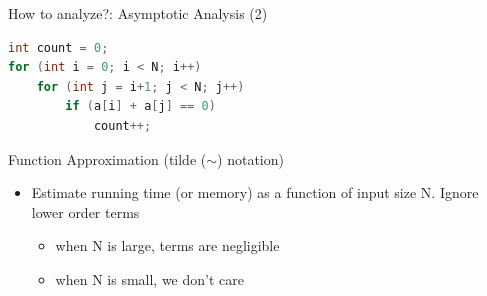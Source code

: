 \documentclass[aspectratio=169, xcolor=dvipsnames]{beamer}
\begin{document}
\begin{frame}[fragile]{How to analyze?: Asymptotic Analysis (2)}
\begin{lstlisting}[language=C++]
int count = 0; 
for (int i = 0; i < N; i++) 
    for (int j = i+1; j < N; j++) 
        if (a[i] + a[j] == 0) 
            count++;
\end{lstlisting}
    \begin{block}{Function Approximation (tilde ($\sim$) notation)}
        \begin{itemize}[<+->]
            \item Estimate running time (or memory) as a function of input size N. Ignore lower order terms
            \begin{itemize}[<+->]
                \item when N is large, terms are negligible
                \item when N is small, we don't care
            \end{itemize}
        \end{itemize}
    \end{block}
\end{frame}
\end{document}
